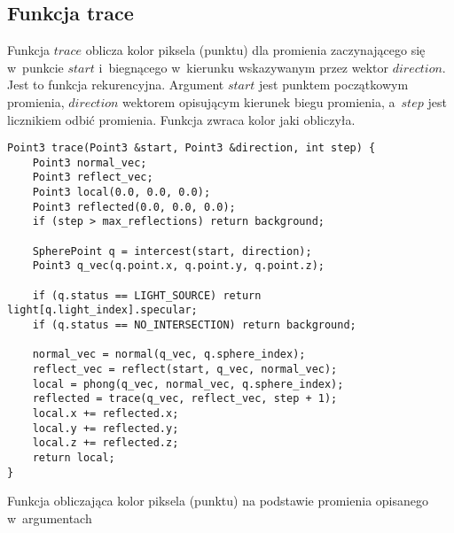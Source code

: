 \documentclass[11pt,a4paper,titlepage]{article}
\newenvironment{longlisting}{\captionsetup{type=listing}}{}
\begin{document}
\subsection{Funkcja trace}
Funkcja $trace$ oblicza kolor piksela (punktu) dla promienia zaczynającego się w~punkcie $start$ i~biegnącego w~kierunku wskazywanym przez wektor $direction$. Jest to funkcja rekurencyjna. Argument $start$ jest punktem początkowym promienia, $direction$ wektorem opisującym kierunek biegu promienia, a~$step$ jest licznikiem odbić promienia. Funkcja zwraca kolor jaki obliczyła.
\begin{longlisting}
\begin{verbatim}
Point3 trace(Point3 &start, Point3 &direction, int step) {
	Point3 normal_vec;
	Point3 reflect_vec;
	Point3 local(0.0, 0.0, 0.0);
	Point3 reflected(0.0, 0.0, 0.0);
	if (step > max_reflections) return background;

	SpherePoint q = intercest(start, direction);
	Point3 q_vec(q.point.x, q.point.y, q.point.z);

	if (q.status == LIGHT_SOURCE) return light[q.light_index].specular;
	if (q.status == NO_INTERSECTION) return background;

	normal_vec = normal(q_vec, q.sphere_index);
	reflect_vec = reflect(start, q_vec, normal_vec);
	local = phong(q_vec, normal_vec, q.sphere_index);
	reflected = trace(q_vec, reflect_vec, step + 1);
	local.x += reflected.x;
	local.y += reflected.y;
	local.z += reflected.z;
	return local;
}
\end{verbatim}
\caption{Funkcja obliczająca kolor piksela (punktu) na podstawie promienia opisanego w~argumentach}
\end{longlisting}
\end{document}
